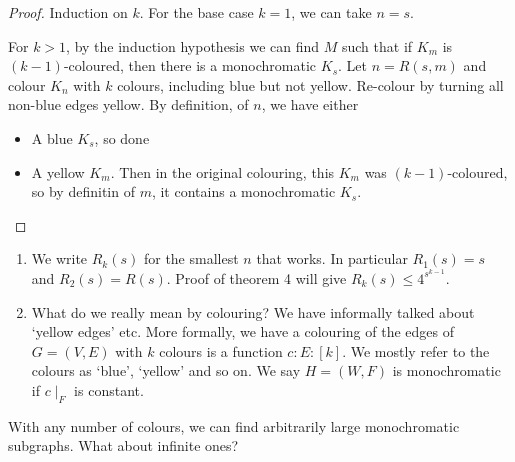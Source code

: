 \documentclass{article}
\begin{document}
\begin{proof}
    Induction on $k$. For the base case $k=1$, we can take $n=s$.

    For $k>1$, by the induction hypothesis we can find $M$ such that if $K_m$ is $(k-1)$-coloured, then there is a monochromatic $K_s$. Let $n = R(s, m)$ and colour $K_n$ with $k$ colours, including blue but not yellow. Re-colour by turning all non-blue edges yellow. By definition, of $n$, we have either
    \begin{itemize}
        \item A blue $K_s$, so done
        \item A yellow $K_m$. Then in the original colouring, this $K_m$ was $(k-1)$-coloured, so by definitin of $m$, it contains a monochromatic $K_s$.
    \end{itemize}
\end{proof}

\begin{remark}
    \begin{enumerate} %
        \item We write $R_k(s)$ for the smallest $n$ that works. In particular $R_1(s) = s$ and $R_2(s) = R(s)$.
            Proof of theorem 4 will give $R_k(s) \leq 4^{s^{k-1}}$.
        \item What do we really mean by colouring?
            We have informally talked about `yellow edges' etc. More formally, we have a colouring of the edges of $G = (V, E)$ with $k$ colours is a function $c: E:[k]$. We mostly refer to the colours as `blue', `yellow' and so on.
            We say $H = (W, F)$ is monochromatic if $c \mid_F$ is constant.
    \end{enumerate}
\end{remark}

With any number of colours, we can find arbitrarily large monochromatic subgraphs. What about infinite ones?


\end{document}
